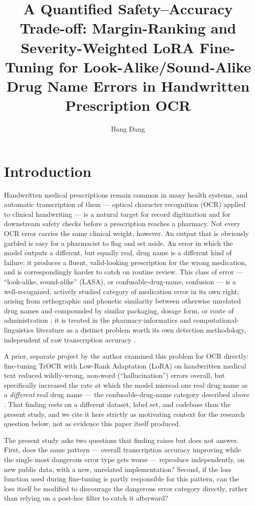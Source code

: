 \documentclass[fleqn,10pt]{wlpeerj}
\title{A Quantified Safety--Accuracy Trade-off: Margin-Ranking and Severity-Weighted LoRA Fine-Tuning for Look-Alike/Sound-Alike Drug Name Errors in Handwritten Prescription OCR}
\author[1]{Bang Dang}
\affil[1]{Independent Researcher}
\begin{document}
\sloppy
\flushbottom
\maketitle
\thispagestyle{empty}

\section*{Introduction}\label{sec:introduction}

Handwritten medical prescriptions remain common in many health systems, and automatic transcription of them --- optical character recognition (OCR) applied to clinical handwriting --- is a natural target for record digitization and for downstream safety checks before a prescription reaches a pharmacy. Not every OCR error carries the same clinical weight, however. An output that is obviously garbled is easy for a pharmacist to flag and set aside. An error in which the model outputs a different, but equally real, drug name is a different kind of failure: it produces a fluent, valid-looking prescription for the wrong medication, and is correspondingly harder to catch on routine review. This class of error --- ``look-alike, sound-alike'' (LASA), or confusable-drug-name, confusion --- is a well-recognized, actively studied category of medication error in its own right, arising from orthographic and phonetic similarity between otherwise unrelated drug names and compounded by similar packaging, dosage form, or route of administration \citep{bryan2021problem}; it is treated in the pharmacy-informatics and computational-linguistics literature as a distinct problem worth its own detection methodology, independent of raw transcription accuracy \citep{kondrak2004identification,kondrak2006automatic}.

A prior, separate project by the author examined this problem for OCR directly: fine-tuning TrOCR with Low-Rank Adaptation (LoRA) on handwritten medical text reduced wildly-wrong, non-word (``hallucination'') errors overall, but specifically increased the rate at which the model misread one real drug name as a \emph{different} real drug name --- the confusable-drug-name category described above \citep[manuscript submitted for publication]{dang2026zeroshot}. That finding rests on a different dataset, label set, and codebase than the present study, and we cite it here strictly as motivating context for the research question below, not as evidence this paper itself produced.

The present study asks two questions that finding raises but does not answer. First, does the same pattern --- overall transcription accuracy improving while the single most dangerous error type gets worse --- reproduce independently, on new public data, with a new, unrelated implementation? Second, if the loss function used during fine-tuning is partly responsible for this pattern, can the loss itself be modified to discourage the dangerous error category directly, rather than relying on a post-hoc filter to catch it afterward?
\end{document}

